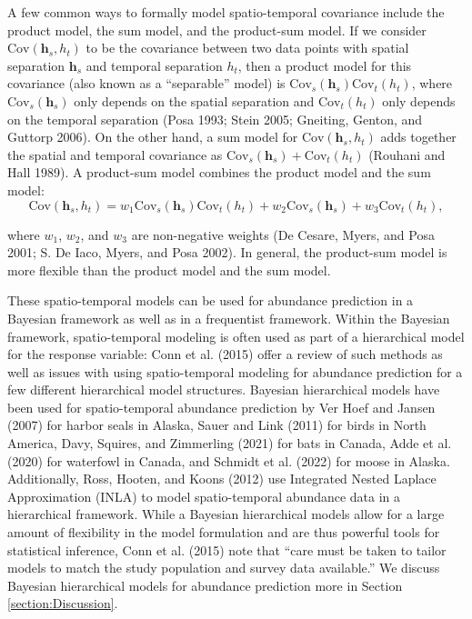 \documentclass[]{article}    %
\begin{document}
A few common ways to formally model spatio-temporal covariance include
the product model, the sum model, and the product-sum model. If we
consider \(\text{Cov}(\mathbf{h}_s, h_t)\) to be the covariance between
two data points with spatial separation \(\mathbf{h}_s\) and temporal
separation \(h_t\), then a product model for this covariance (also known
as a ``separable'' model) is
\(\text{Cov}_s(\mathbf{h}_s) \text{Cov}_t(h_t)\), where
\(\text{Cov}_s(\mathbf{h}_s)\) only depends on the spatial separation
and \(\text{Cov}_t(h_t)\) only depends on the temporal separation (Posa
1993; Stein 2005; Gneiting, Genton, and Guttorp 2006). On the other
hand, a sum model for \(\text{Cov}(\mathbf{h}_s, h_t)\) adds together
the spatial and temporal covariance as
\(\text{Cov}_s(\mathbf{h}_s) + \text{Cov}_t(h_t)\) (Rouhani and Hall
1989). A product-sum model combines the product model and the sum model:
\mbox{} \begin{equation}
\text{Cov}(\mathbf{h}_s, h_t) = w_1\text{Cov}_s(\mathbf{h}_s) \text{Cov}_t(h_t) + w_2\text{Cov}_s(\mathbf{h}_s) + w_3\text{Cov}_t(h_t),
\end{equation}

\noindent where \(w_1\), \(w_2\), and \(w_3\) are non-negative weights
(De Cesare, Myers, and Posa 2001; S. De Iaco, Myers, and Posa 2002). In
general, the product-sum model is more flexible than the product model
and the sum model.

These spatio-temporal models can be used for abundance prediction in a
Bayesian framework as well as in a frequentist framework. Within the
Bayesian framework, spatio-temporal modeling is often used as part of a
hierarchical model for the response variable: Conn et al. (2015) offer a
review of such methods as well as issues with using spatio-temporal
modeling for abundance prediction for a few different hierarchical model
structures. Bayesian hierarchical models have been used for
spatio-temporal abundance prediction by Ver Hoef and Jansen (2007) for
harbor seals in Alaska, Sauer and Link (2011) for birds in North
America, Davy, Squires, and Zimmerling (2021) for bats in Canada, Adde
et al. (2020) for waterfowl in Canada, and Schmidt et al. (2022) for
moose in Alaska. Additionally, Ross, Hooten, and Koons (2012) use
Integrated Nested Laplace Approximation (INLA) to model spatio-temporal
abundance data in a hierarchical framework. While a Bayesian
hierarchical models allow for a large amount of flexibility in the model
formulation and are thus powerful tools for statistical inference, Conn
et al. (2015) note that ``care must be taken to tailor models to match
the study population and survey data available.'' We discuss Bayesian
hierarchical models for abundance prediction more in Section
\ref{section:Discussion}.
\end{document}
